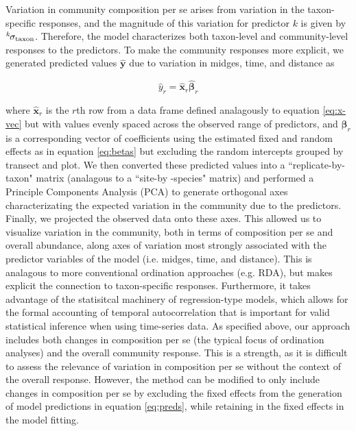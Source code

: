 Variation in community composition per se arises from variation in the taxon-specific
responses, and the magnitude of this
variation for predictor $k$ is given by ${}^k\hspace*{-1pt}\sigma_\text{taxon}$.
Therefore, the model characterizes both
taxon-level and community-level responses to the predictors.
To make the community responses more explicit, we generated predicted values
$\hat{\mathbf{y}}$ due to variation in midges, time, and distance as

\begin{equation} \label{eq:preds}
    \hat{y}_r = \hat{\mathbf{x}}_r \hat{{\boldsymbol\beta}}_r
\end{equation}

\noindent where $\hat{\mathbf{x}}_r$ is the $r$th row from a data frame defined
analagously to equation \ref{eq:x-vec} but with values evenly spaced across the
observed range of predictors, and $\hat{{\boldsymbol\beta}}_r$ is a
corresponding vector of coefficients using the estimated fixed and random effects
as in equation \ref{eq:betas} but excluding the random intercepts grouped
by transect and plot. We then converted these predicted values into a
``replicate-by-taxon" matrix (analagous to a ``site-by
-species" matrix) and performed a Principle Components Analysis (PCA) to
generate orthogonal axes characterizating the expected
variation in the community due to the predictors.
Finally, we projected the observed data onto these axes.
This allowed us to visualize variation in the community, both in terms of
composition per se and overall abundance, along axes of variation most
strongly associated with the predictor variables of the model
(i.e. midges, time, and distance).
This is analagous to more conventional ordination approaches (e.g. RDA),
but makes explicit the connection to taxon-specific responses.
Furthermore, it takes advantage  of the statisitcal machinery of
regression-type models, which allows for the formal accounting of temporal
autocorrelation that is important for valid statistical inference when using
time-series data.
As specified above, our approach includes both changes in composition per se
(the typical focus of ordination analyses) and the overall community response.
This is a strength, as it is difficult to assess the relevance of variation in
composition per se without the context of the overall response.
However, the method can be modified to only include changes in composition
per se by excluding the fixed effects from the generation of model predictions
in equation \ref{eq:preds}, while retaining in the fixed effects in the model fitting.

